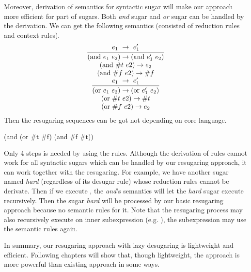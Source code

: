 Moreover, derivation of semantics for syntactic sugar will make our approach more efficient for part of sugars. Both \emph{and} sugar and \emph{or} sugar can be handled by the derivation. We can get the following semantics (consisted of reduction rules and context rules).
\[
\begin{array}{c}
\infer {(\mbox{and}~e_1~e_2) \rightarrow (\mbox{and}~e_1'~e_2)} {e_1~ \rightarrow~e_1'}\\
(\mbox{and}~\#t~e2) \rightarrow e_2 \\
(\mbox{and}~\#f~e2) \rightarrow \#f \\
\infer {(\mbox{or}~e_1~e_2) \rightarrow (\mbox{or}~e_1'~e_2)} {e_1~ \rightarrow~e_1'}\\
(\mbox{or}~\#t~e2) \rightarrow \#t \\
(\mbox{or}~\#f~e2) \rightarrow e_2 \\
\end{array}
\]
Then the resugaring sequences can be got not depending on core language.
\begin{Codes}
    (and (or \#t \#f) (and \#f \#t))
\end{Codes}

Only 4 steps is needed by using the rules. Although the derivation of rules cannot work for all syntactic sugars which can be handled by our resugaring approach, it can work together with the resugaring. For example, we have another sugar named \emph{hard} (regardless of its desugar rule) whose reduction rules cannot be derivate.
Then if we execute , the \emph{and}'s semantics will let the \emph{hard} sugar execute recursively. Then the sugar \emph{hard} will be processed by our basic resugaring approach because no semantic rules for it. Note that the resugaring process may also recursively execute on inner subexpression (e.g. ), the subexpression may use the semantic rules again.

In summary, our resugaring approach with lazy desugaring is lightweight and efficient. Following chapters will show that, though lightweight, the approach is more powerful than existing approach in some ways.
